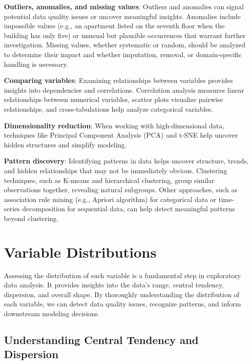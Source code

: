 \documentclass[12pt,openany]{book}
\begin{document}
\textbf{Outliers, anomalies, and missing values}: Outliers and anomalies can signal potential data quality issues or uncover meaningful insights. Anomalies include impossible values (e.g., an apartment listed on the seventh floor when the building has only five) or unusual but plausible occurrences that warrant further investigation. Missing values, whether systematic or random, should be analyzed to determine their impact and whether imputation, removal, or domain-specific handling is necessary.
\newline

\textbf{Comparing variables}: Examining relationships between variables provides insights into dependencies and correlations. Correlation analysis measures linear relationships between numerical variables, scatter plots visualize pairwise relationships, and cross-tabulations help analyze categorical variables.
\newline

\textbf{Dimensionality reduction}: When working with high-dimensional data, techniques like Principal Component Analysis (PCA) and t-SNE help uncover hidden structures and simplify modeling.
\newline

\textbf{Pattern discovery}: Identifying patterns in data helps uncover structure, trends, and hidden relationships that may not be immediately obvious. Clustering techniques, such as K-means and hierarchical clustering, group similar observations together, revealing natural subgroups. Other approaches, such as association rule mining (e.g., Apriori algorithm) for categorical data or time-series decomposition for sequential data, can help detect meaningful patterns beyond clustering.
\newline


\section{Variable Distributions}

Assessing the distribution of each variable is a fundamental step in exploratory data analysis. It provides insights into the data's range, central tendency, dispersion, and overall shape. By thoroughly understanding the distribution of each variable, we can detect data quality issues, recognize patterns, and inform downstream modeling decisions.

\subsection{Understanding Central Tendency and Dispersion}
\end{document}
